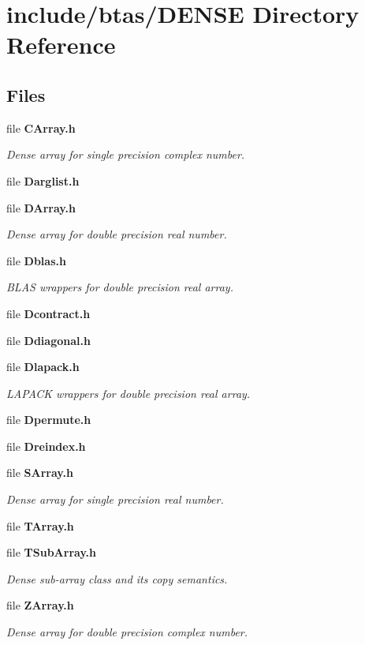 \section{include/btas/\-D\-E\-N\-S\-E Directory Reference}
\label{dir_9837882fe6a744d9b42023734faaf2a0}
\subsection*{Files}
\begin{DoxyCompactItemize}
\item 
file {\bf C\-Array.\-h}
\begin{DoxyCompactList}\small\item\em Dense array for single precision complex number. \end{DoxyCompactList}\item 
file {\bf Darglist.\-h}
\item 
file {\bf D\-Array.\-h}
\begin{DoxyCompactList}\small\item\em Dense array for double precision real number. \end{DoxyCompactList}\item 
file {\bf Dblas.\-h}
\begin{DoxyCompactList}\small\item\em B\-L\-A\-S wrappers for double precision real array. \end{DoxyCompactList}\item 
file {\bf Dcontract.\-h}
\item 
file {\bf Ddiagonal.\-h}
\item 
file {\bf Dlapack.\-h}
\begin{DoxyCompactList}\small\item\em L\-A\-P\-A\-C\-K wrappers for double precision real array. \end{DoxyCompactList}\item 
file {\bf Dpermute.\-h}
\item 
file {\bf Dreindex.\-h}
\item 
file {\bf S\-Array.\-h}
\begin{DoxyCompactList}\small\item\em Dense array for single precision real number. \end{DoxyCompactList}\item 
file {\bf T\-Array.\-h}
\item 
file {\bf T\-Sub\-Array.\-h}
\begin{DoxyCompactList}\small\item\em Dense sub-\/array class and its copy semantics. \end{DoxyCompactList}\item 
file {\bf Z\-Array.\-h}
\begin{DoxyCompactList}\small\item\em Dense array for double precision complex number. \end{DoxyCompactList}\end{DoxyCompactItemize}
